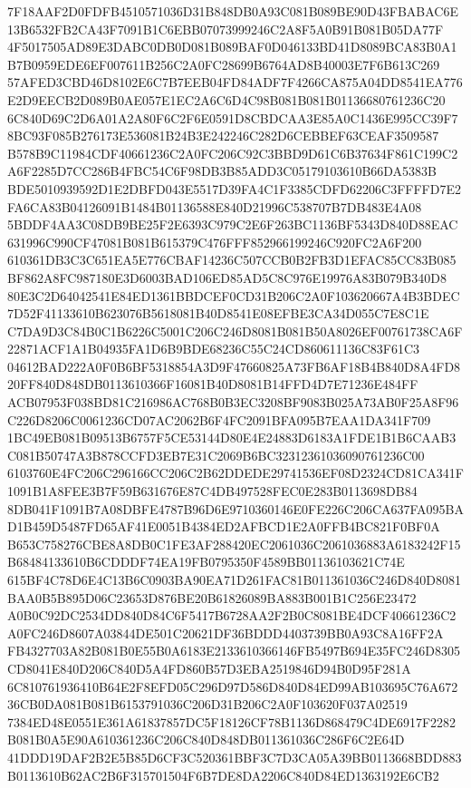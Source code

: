 \documentclass[UTF8,fontset=fandol,zihao=-4,a4paper]{ctexart}
\begin{document}
{{7F18AAF2D0FDFB4510571036D31B848DB0A93C081B089BE90D43FBABAC6E13B6532FB2CA43F7091B1C6EBB07073999246C2A8F5A0B91B081B05DA77F
4F5017505AD89E3DABC0DB0D081B089BAF0D046133BD41D8089BCA83B0A1B7B0959EDE6EF007611B256C2A0FC28699B6764AD8B40003E7F6B613C269
57AFED3CBD46D8102E6C7B7EEB04FD84ADF7F4266CA875A04DD8541EA776E2D9EECB2D089B0AE057E1EC2A6C6D4C98B081B081B01136680761236C20
6C840D69C2D6A01A2A80F6C2F6E0591D8CBDCAA3E85A0C1436E995CC39F78BC93F085B276173E536081B24B3E242246C282D6CEBBEF63CEAF3509587
B578B9C11984CDF40661236C2A0FC206C92C3BBD9D61C6B37634F861C199C2A6F2285D7CC286B4FBC54C6F98DB3B85ADD3C05179103610B66DA5383B
BDE5010939592D1E2DBFD043E5517D39FA4C1F3385CDFD62206C3FFFFD7E2FA6CA83B04126091B1484B01136588E840D21996C538707B7DB483E4A08
5BDDF4AA3C08DB9BE25F2E6393C979C2E6F263BC1136BF5343D840D88EAC631996C990CF47081B081B615379C476FFF852966199246C920FC2A6F200
610361DB3C3C651EA5E776CBAF14236C507CCB0B2FB3D1EFAC85CC83B085BF862A8FC987180E3D6003BAD106ED85AD5C8C976E19976A83B079B340D8
80E3C2D64042541E84ED1361BBDCEF0CD31B206C2A0F103620667A4B3BDEC7D52F41133610B623076B5618081B40D8541E08EFBE3CA34D055C7E8C1E
C7DA9D3C84B0C1B6226C5001C206C246D8081B081B50A8026EF00761738CA6F22871ACF1A1B04935FA1D6B9BDE68236C55C24CD860611136C83F61C3
04612BAD222A0F0B6BF5318854A3D9F47660825A73FB6AF18B4B840D8A4FD820FF840D848DB0113610366F16081B40D8081B14FFD4D7E71236E484FF
ACB07953F038BD81C216986AC768B0B3EC3208BF9083B025A73AB0F25A8F96C226D8206C0061236CD07AC2062B6F4FC2091BFA095B7EAA1DA341F709
1BC49EB081B09513B6757F5CE53144D80E4E24883D6183A1FDE1B1B6CAAB3C081B50747A3B878CCFD3EB7E31C2069B6BC32312361036090761236C00
6103760E4FC206C296166CC206C2B62DDEDE29741536EF08D2324CD81CA341F1091B1A8FEE3B7F59B631676E87C4DB497528FEC0E283B0113698DB84
8DB041F1091B7A08DBFE4787B96D6E9710360146E0FE226C206CA637FA095BAD1B459D5487FD65AF41E0051B4384ED2AFBCD1E2A0FFB4BC821F0BF0A
B653C758276CBE8A8DB0C1FE3AF288420EC2061036C2061036883A6183242F15B68484133610B6CDDDF74EA19FB0795350F4589BB01136103621C74E
615BF4C78D6E4C13B6C0903BA90EA71D261FAC81B011361036C246D840D8081BAA0B5B895D06C23653D876BE20B61826089BA883B001B1C256E23472
A0B0C92DC2534DD840D84C6F5417B6728AA2F2B0C8081BE4DCF40661236C2A0FC246D8607A03844DE501C20621DF36BDDD4403739BB0A93C8A16FF2A
FB4327703A82B081B0E55B0A6183E2133610366146FB5497B694E35FC246D8305CD8041E840D206C840D5A4FD860B57D3EBA2519846D94B0D95F281A
6C810761936410B64E2F8EFD05C296D97D586D840D84ED99AB103695C76A67236CB0DA081B081B6153791036C206D31B206C2A0F103620F037A02519
7384ED48E0551E361A61837857DC5F18126CF78B1136D868479C4DE6917F2282B081B0A5E90A610361236C206C840D848DB011361036C286F6C2E64D
41DDD19DAF2B2E5B85D6CF3C520361BBF3C7D3CA05A39BB0113668BDD883B0113610B62AC2B6F315701504F6B7DE8DA2206C840D84ED1363192E6CB2
}}
\end{document}
